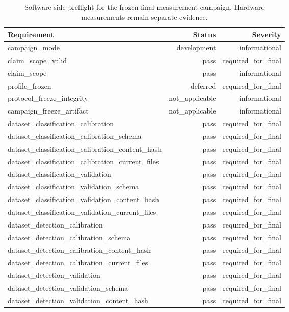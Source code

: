 \begin{table}[t]
\centering
\small
\caption{Software-side preflight for the frozen final measurement campaign. Hardware measurements remain separate evidence.}
\label{tab:campaign-readiness}
\begin{tabular}{lrr}
\toprule
Requirement & Status & Severity \\
\midrule
campaign\_mode & development & informational \\
claim\_scope\_valid & pass & required\_for\_final \\
claim\_scope & pass & informational \\
profile\_frozen & deferred & required\_for\_final \\
protocol\_freeze\_integrity & not\_applicable & informational \\
campaign\_freeze\_artifact & not\_applicable & informational \\
dataset\_classification\_calibration & pass & required\_for\_final \\
dataset\_classification\_calibration\_schema & pass & required\_for\_final \\
dataset\_classification\_calibration\_content\_hash & pass & required\_for\_final \\
dataset\_classification\_calibration\_current\_files & pass & required\_for\_final \\
dataset\_classification\_validation & pass & required\_for\_final \\
dataset\_classification\_validation\_schema & pass & required\_for\_final \\
dataset\_classification\_validation\_content\_hash & pass & required\_for\_final \\
dataset\_classification\_validation\_current\_files & pass & required\_for\_final \\
dataset\_detection\_calibration & pass & required\_for\_final \\
dataset\_detection\_calibration\_schema & pass & required\_for\_final \\
dataset\_detection\_calibration\_content\_hash & pass & required\_for\_final \\
dataset\_detection\_calibration\_current\_files & pass & required\_for\_final \\
dataset\_detection\_validation & pass & required\_for\_final \\
dataset\_detection\_validation\_schema & pass & required\_for\_final \\
dataset\_detection\_validation\_content\_hash & pass & required\_for\_final \\

\end{tabular}
\end{table}

